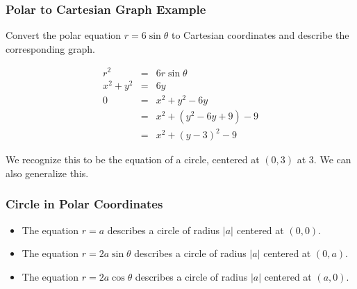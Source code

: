 \subsubsection{Polar to Cartesian Graph Example}
Convert the polar equation $r = 6 \sin \theta$ to Cartesian coordinates and describe the corresponding graph.

\begin{eqnarray}
  r^2 & = & 6r\sin\theta \\
  x^2 + y^2 & = & 6y \\
  0 & = & x^2 + y^2 - 6y \\
    & = & x^2 + (y^2 - 6y + 9) - 9  \\
    & = & x^2 + (y- 3)^2 - 9
\end{eqnarray}

We recognize this to be the equation of a circle, centered at $(0, 3)$ at $3$. We can also generalize this.

\subsubsection{Circle in Polar Coordinates}
\begin{itemize}
    \item The equation $r = a$ describes a circle of radius $|a|$ centered at $(0, 0)$.
    \item The equation $r = 2a \sin \theta$ describes a circle of radius  $|a|$ centered at $(0, a)$.
    \item The equation $r = 2a \cos \theta$ describes a circle of radius $|a|$ centered at $(a, 0)$.
\end{itemize}

